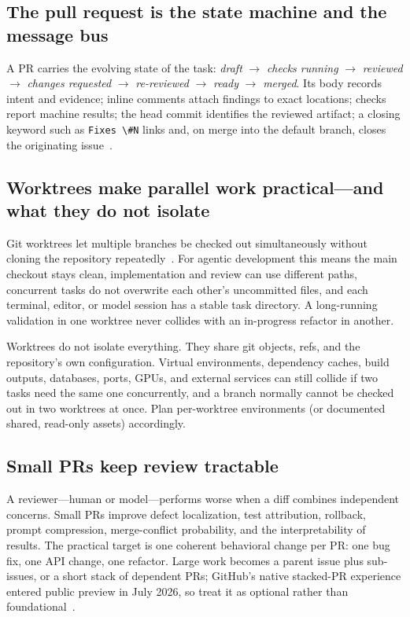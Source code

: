 \documentclass[11pt]{article}
\newcommand{\co}[1]{\lstinline[basicstyle=\ttfamily\color{gwInk}]{#1}}
\begin{document}
\subsection{The pull request is the state machine and the message bus}

A PR carries the evolving state of the task:
\emph{draft} \(\to\) \emph{checks running} \(\to\) \emph{reviewed} \(\to\)
\emph{changes requested} \(\to\) \emph{re-reviewed} \(\to\) \emph{ready} \(\to\) \emph{merged}.
Its body records intent and evidence; inline comments attach findings to exact locations; checks
report machine results; the head commit identifies the reviewed artifact; a closing keyword such
as \co{Fixes \#N} links and, on merge into the default branch, closes the originating
issue~\cite{github2026prs,github2026linking}.

\subsection{Worktrees make parallel work practical---and what they do not isolate}

Git worktrees let multiple branches be checked out simultaneously without cloning the repository
repeatedly~\cite{git2026worktree}. For agentic development this means the main checkout stays
clean, implementation and review can use different paths, concurrent tasks do not overwrite each
other's uncommitted files, and each terminal, editor, or model session has a stable task
directory. A long-running validation in one worktree never collides with an in-progress refactor
in another.

Worktrees do not isolate everything. They share git objects, refs, and the repository's own
configuration. Virtual environments, dependency caches, build outputs, databases, ports, GPUs,
and external services can still collide if two tasks need the same one concurrently, and a branch
normally cannot be checked out in two worktrees at once. Plan per-worktree environments (or
documented shared, read-only assets) accordingly.

\subsection{Small PRs keep review tractable}

A reviewer---human or model---performs worse when a diff combines independent concerns. Small PRs
improve defect localization, test attribution, rollback, prompt compression, merge-conflict
probability, and the interpretability of results. The practical target is one coherent behavioral
change per PR: one bug fix, one API change, one refactor. Large work becomes a parent issue plus
sub-issues, or a short stack of dependent PRs; GitHub's native stacked-PR experience entered
public preview in July 2026, so treat it as optional rather than
foundational~\cite{github2026stacked}.
\end{document}
